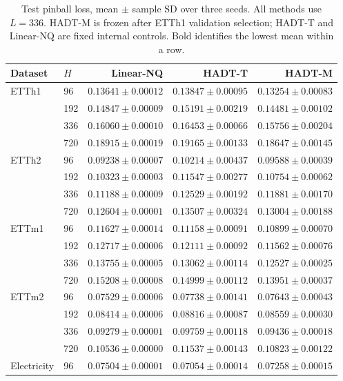 \begin{table}[t]
\centering\small
\caption{Test pinball loss, mean $\pm$ sample SD over three seeds. All methods use $L=336$. HADT-M is frozen after ETTh1 validation selection; HADT-T and Linear-NQ are fixed internal controls. Bold identifies the lowest mean within a row.}
\label{tab:transfer}
\begin{tabular}{@{}llrrr@{}}
\toprule
Dataset & $H$ & Linear-NQ & HADT-T & HADT-M \\
\midrule
ETTh1 & 96 & $0.13641\pm0.00012$ & $0.13847\pm0.00095$ & \boldmath $0.13254\pm0.00083$ \\
 & 192 & $0.14847\pm0.00009$ & $0.15191\pm0.00219$ & \boldmath $0.14481\pm0.00102$ \\
 & 336 & $0.16060\pm0.00010$ & $0.16453\pm0.00066$ & \boldmath $0.15756\pm0.00204$ \\
 & 720 & $0.18915\pm0.00019$ & $0.19165\pm0.00133$ & \boldmath $0.18647\pm0.00145$ \\
\midrule
ETTh2 & 96 & \boldmath $0.09238\pm0.00007$ & $0.10214\pm0.00437$ & $0.09588\pm0.00039$ \\
 & 192 & \boldmath $0.10323\pm0.00003$ & $0.11547\pm0.00277$ & $0.10754\pm0.00062$ \\
 & 336 & \boldmath $0.11188\pm0.00009$ & $0.12529\pm0.00192$ & $0.11881\pm0.00170$ \\
 & 720 & \boldmath $0.12604\pm0.00001$ & $0.13507\pm0.00324$ & $0.13004\pm0.00188$ \\
\midrule
ETTm1 & 96 & $0.11627\pm0.00014$ & $0.11158\pm0.00091$ & \boldmath $0.10899\pm0.00070$ \\
 & 192 & $0.12717\pm0.00006$ & $0.12111\pm0.00092$ & \boldmath $0.11562\pm0.00076$ \\
 & 336 & $0.13755\pm0.00005$ & $0.13062\pm0.00114$ & \boldmath $0.12527\pm0.00025$ \\
 & 720 & $0.15208\pm0.00008$ & $0.14999\pm0.00112$ & \boldmath $0.13951\pm0.00037$ \\
\midrule
ETTm2 & 96 & \boldmath $0.07529\pm0.00006$ & $0.07738\pm0.00141$ & $0.07643\pm0.00043$ \\
 & 192 & \boldmath $0.08414\pm0.00006$ & $0.08816\pm0.00087$ & $0.08559\pm0.00030$ \\
 & 336 & \boldmath $0.09279\pm0.00001$ & $0.09759\pm0.00118$ & $0.09436\pm0.00018$ \\
 & 720 & \boldmath $0.10536\pm0.00000$ & $0.11537\pm0.00143$ & $0.10823\pm0.00122$ \\
\midrule
Electricity & 96 & $0.07504\pm0.00001$ & \boldmath $0.07054\pm0.00014$ & $0.07258\pm0.00015$ \\

\end{tabular}
\end{table}
